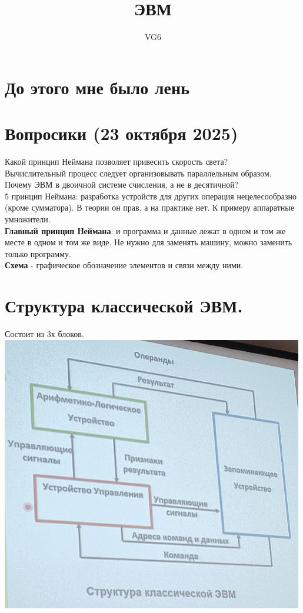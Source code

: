 \documentclass[12px]{article}
\title{ЭВМ}
\author{VG6}
\begin{document}
\maketitle

\section{До этого мне было лень}
\section*{Вопросики (23 октября 2025)}
Какой принцип Неймана позволяет привесить скорость света?\\
Вычислительный процесс следует организовывать параллельным образом.\\
Почему ЭВМ в двоичной системе счисления, а не в десятичной?\\
5 принцип Неймана: разработка устройств для других операция нецелесообразно (кроме сумматора). В теории он прав, а на практике нет. К примеру аппаратные умножители. \\
\textbf{Главный принцип Неймана}: и программа и данные лежат в одном и том же месте в одном и том же виде. Не нужно для заменять машину, можно заменить только программу. \\
\textbf{Схема} - графическое обозначение элементов и связи между ними. \\

\section{Структура классической ЭВМ.}
Состоит из 3х блоков.\\
\includegraphics[width=0.5\linewidth]{images/Схема ЭВМ.png}\\
\end{document}
